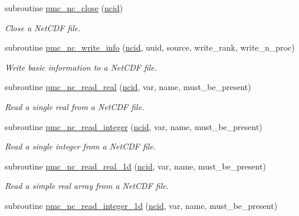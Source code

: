\begin{DoxyCompactItemize}
subroutine \mbox{\hyperlink{namespacepmc__netcdf_afd71cfd565645514fd53dce13a3a5958}{pmc\+\_\+nc\+\_\+close}} (\mbox{\hyperlink{fractal_8_f90_a4e89f3f850921ff84a6dfce8b166ad50}{ncid}})
\begin{DoxyCompactList}\small\item\em Close a Net\+C\+DF file. \end{DoxyCompactList}\item 
subroutine \mbox{\hyperlink{namespacepmc__netcdf_a252de5ecdfc83bdde7492cd9800723df}{pmc\+\_\+nc\+\_\+write\+\_\+info}} (\mbox{\hyperlink{fractal_8_f90_a4e89f3f850921ff84a6dfce8b166ad50}{ncid}}, uuid, source, write\+\_\+rank, write\+\_\+n\+\_\+proc)
\begin{DoxyCompactList}\small\item\em Write basic information to a Net\+C\+DF file. \end{DoxyCompactList}\item 
subroutine \mbox{\hyperlink{namespacepmc__netcdf_ae8b035a6a051f796e82393d51c2739ff}{pmc\+\_\+nc\+\_\+read\+\_\+real}} (\mbox{\hyperlink{fractal_8_f90_a4e89f3f850921ff84a6dfce8b166ad50}{ncid}}, var, name, must\+\_\+be\+\_\+present)
\begin{DoxyCompactList}\small\item\em Read a single real from a Net\+C\+DF file. \end{DoxyCompactList}\item 
subroutine \mbox{\hyperlink{namespacepmc__netcdf_acdc3a760526d3131efd57ddaff34904d}{pmc\+\_\+nc\+\_\+read\+\_\+integer}} (\mbox{\hyperlink{fractal_8_f90_a4e89f3f850921ff84a6dfce8b166ad50}{ncid}}, var, name, must\+\_\+be\+\_\+present)
\begin{DoxyCompactList}\small\item\em Read a single integer from a Net\+C\+DF file. \end{DoxyCompactList}\item 
subroutine \mbox{\hyperlink{namespacepmc__netcdf_af964e1e3180f125f1529aa83f4f9fdef}{pmc\+\_\+nc\+\_\+read\+\_\+real\+\_\+1d}} (\mbox{\hyperlink{fractal_8_f90_a4e89f3f850921ff84a6dfce8b166ad50}{ncid}}, var, name, must\+\_\+be\+\_\+present)
\begin{DoxyCompactList}\small\item\em Read a simple real array from a Net\+C\+DF file. \end{DoxyCompactList}\item 
subroutine \mbox{\hyperlink{namespacepmc__netcdf_a163630aa93ceda585435019762b4e2e0}{pmc\+\_\+nc\+\_\+read\+\_\+integer\+\_\+1d}} (\mbox{\hyperlink{fractal_8_f90_a4e89f3f850921ff84a6dfce8b166ad50}{ncid}}, var, name, must\+\_\+be\+\_\+present)

\end{DoxyCompactItemize}
